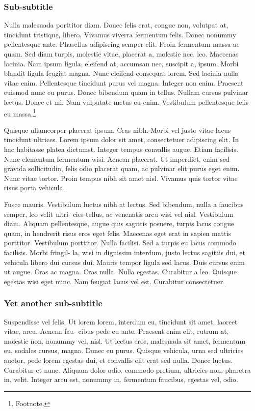 \documentclass[english]{uzhpub}
\begin{document}
\subsubsection{Sub-subtitle}

Nulla malesuada porttitor diam. Donec felis erat, congue non, volutpat
at, tincidunt tristique, libero. Vivamus viverra fermentum felis.
Donec nonummy pellentesque ante. Phasellus adipiscing semper elit.
Proin fermentum massa ac quam. Sed diam turpis, molestie vitae, placerat
a, molestie nec, leo. Maecenas lacinia. Nam ipsum ligula, eleifend
at, accumsan nec, suscipit a, ipsum. Morbi blandit ligula feugiat
magna. Nunc eleifend consequat lorem. Sed lacinia nulla vitae enim.
Pellentesque tincidunt purus vel magna. Integer non enim. Praesent
euismod nunc eu purus. Donec bibendum quam in tellus. Nullam cursus
pulvinar lectus. Donec et mi. Nam vulputate metus eu enim. Vestibulum
pellentesque felis eu massa.\footnote{Footnote.}

Quisque ullamcorper placerat ipsum. Cras nibh. Morbi vel justo vitae
lacus tincidunt ultrices. Lorem ipsum dolor sit amet, consectetuer
adipiscing elit. In hac habitasse platea dictumst. Integer tempus
convallis augue. Etiam facilisis. Nunc elementum fermentum wisi. Aenean
placerat. Ut imperdiet, enim sed gravida sollicitudin, felis odio
placerat quam, ac pulvinar elit purus eget enim. Nunc vitae tortor.
Proin tempus nibh sit amet nisl. Vivamus quis tortor vitae risus porta
vehicula. 

Fusce mauris. Vestibulum luctus nibh at lectus. Sed bibendum, nulla
a faucibus semper, leo velit ultri- cies tellus, ac venenatis arcu
wisi vel nisl. Vestibulum diam. Aliquam pellentesque, augue quis sagittis
posuere, turpis lacus congue quam, in hendrerit risus eros eget felis.
Maecenas eget erat in sapien mattis porttitor. Vestibulum porttitor.
Nulla facilisi. Sed a turpis eu lacus commodo facilisis. Morbi fringil-
la, wisi in dignissim interdum, justo lectus sagittis dui, et vehicula
libero dui cursus dui. Mauris tempor ligula sed lacus. Duis cursus
enim ut augue. Cras ac magna. Cras nulla. Nulla egestas. Curabitur
a leo. Quisque egestas wisi eget nunc. Nam feugiat lacus vel est.
Curabitur consectetuer.

\subsubsection{Yet another sub-subtitle}

Suspendisse vel felis. Ut lorem lorem, interdum eu, tincidunt sit
amet, laoreet vitae, arcu. Aenean fau- cibus pede eu ante. Praesent
enim elit, rutrum at, molestie non, nonummy vel, nisl. Ut lectus eros,
malesuada sit amet, fermentum eu, sodales cursus, magna. Donec eu
purus. Quisque vehicula, urna sed ultricies auctor, pede lorem egestas
dui, et convallis elit erat sed nulla. Donec luctus. Curabitur et
nunc. Aliquam dolor odio, commodo pretium, ultricies non, pharetra
in, velit. Integer arcu est, nonummy in, fermentum faucibus, egestas
vel, odio. 
\end{document}
